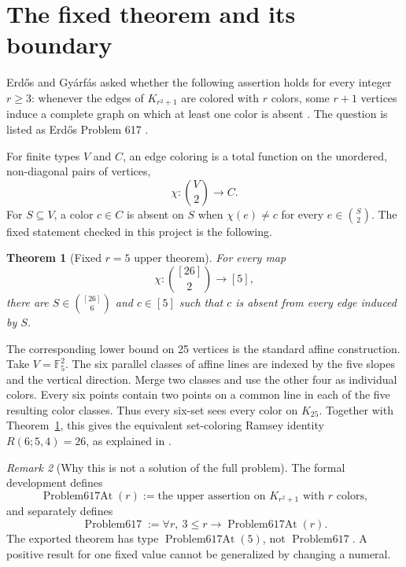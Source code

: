 \documentclass[11pt,reqno,a4paper]{amsart}
\newtheorem{theorem}{Theorem}[section]
\theoremstyle{definition}
\theoremstyle{remark}
\newtheorem{remark}[theorem]{Remark}
\newcommand{\ProblemAt}{\operatorname{Problem617At}}
\begin{document}
\section{The fixed theorem and its boundary}

Erd\H{o}s and Gy\'arf\'as asked whether the following assertion holds for
every integer \(r\geq3\): whenever the edges of \(K_{r^2+1}\) are colored
with \(r\) colors, some \(r+1\) vertices induce a complete graph on which at
least one color is absent \cite{ErdosGyarfas1999,Erdos1999}.  The question is
listed as Erd\H{o}s Problem 617 \cite{ErdosProblems617}.

For finite types \(V\) and \(C\), an edge coloring is a total function on the
unordered, non-diagonal pairs of vertices,
\[
  \chi:\binom V2\longrightarrow C.
\]
For \(S\subseteq V\), a color \(c\in C\) is absent on \(S\) when
\(\chi(e)\ne c\) for every \(e\in\binom S2\).  The fixed statement checked in
this project is the following.

\begin{theorem}[Fixed \(r=5\) upper theorem]\label{thm:r5}
For every map
\[
  \chi:\binom{[26]}2\longrightarrow[5],
\]
there are \(S\in\binom{[26]}6\) and \(c\in[5]\) such that \(c\) is absent
from every edge induced by \(S\).
\end{theorem}

The corresponding lower bound on 25 vertices is the standard affine
construction.  Take \(V=\mathbb F_5^2\).  The six parallel classes of affine
lines are indexed by the five slopes and the vertical direction.  Merge two
classes and use the other four as individual colors.  Every six points
contain two points on a common line in each of the five resulting color
classes.  Thus every six-set sees every color on \(K_{25}\).  Together with
Theorem~\ref{thm:r5}, this gives the equivalent set-coloring Ramsey identity
\(R(6;5,4)=26\), as explained in \cite{Sneiderman2026}.

\begin{remark}[Why this is not a solution of the full problem]
The formal development defines
\[
  \ProblemAt(r) :=
  \text{the upper assertion on }K_{r^2+1}\text{ with }r\text{ colors},
\]
and separately defines
\[
  \operatorname{Problem617}:=
  \forall r,\ 3\le r\longrightarrow\ProblemAt(r).
\]
The exported theorem has type \(\ProblemAt(5)\), not
\(\operatorname{Problem617}\).  A positive result for one fixed value cannot
be generalized by changing a numeral.
\end{remark}
\end{document}
